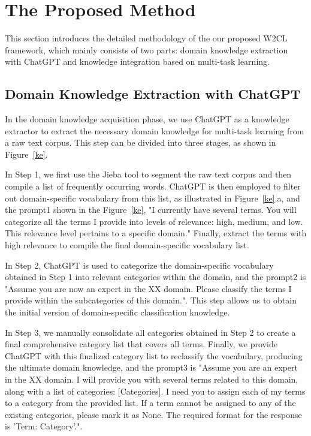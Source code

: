 \section{The Proposed Method}
\label{sec:method}
This section introduces the detailed methodology of the our proposed W2CL framework, which mainly consists of two parts: domain knowledge extraction with ChatGPT and knowledge integration based on multi-task learning.
\subsection{Domain Knowledge Extraction with ChatGPT}
In the domain knowledge acquisition phase, we use ChatGPT as a knowledge extractor to extract the necessary domain knowledge for multi-task learning from a raw text corpus. This step can be divided into three stages, as shown in Figure~\ref{ke}.

In Step 1, we first use the Jieba tool to segment the raw text corpus and then compile a list of frequently occurring words. ChatGPT is then employed to filter out domain-specific vocabulary from this list, as illustrated in Figure~\ref{ke}.a, and the prompt1 shown in the Figure~\ref{ke}, "I currently have several terms. You will categorize all the terms I provide into levels of relevance: high, medium, and low. This relevance level pertains to a specific domain." Finally, extract the terms with high relevance to compile the final domain-specific vocabulary list.

In Step 2, ChatGPT is used to categorize the domain-specific vocabulary obtained in Step 1 into relevant categories within the domain, and the prompt2 is "Assume you are now an expert in the XX domain. Please classify the terms I provide within the subcategories of this domain.". This step allows us to obtain the initial version of domain-specific classification knowledge.

In Step 3, we manually consolidate all categories obtained in Step 2 to create a final comprehensive category list that covers all terms. Finally, we provide ChatGPT with this finalized category list to reclassify the vocabulary, producing the ultimate domain knowledge, and the prompt3 is "Assume you are an expert in the XX domain. I will provide you with several terms related to this domain, along with a list of categories: [Categories]. I need you to assign each of my terms to a category from the provided list. If a term cannot be assigned to any of the existing categories, please mark it as None. The required format for the response is 'Term: Category'.".

